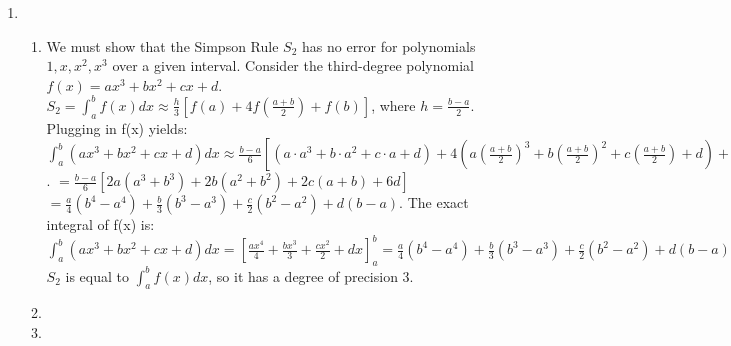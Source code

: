 \documentclass[12pt]{article}
\begin{document}
\begin{enumerate}[leftmargin=2em]
    \item 
    \begin{enumerate}[leftmargin=!]
        \item We must show that the Simpson Rule $S_2$ has no error for polynomials $1, x, x^{2}, x^{3}$ over a given interval. Consider the third-degree polynomial \( f(x) = ax^3 + bx^2 + cx + d \).
        \(S_2 = \int _{a}^{b}f(x)dx\approx \frac{h}{3}\left[f(a)+4f\left(\frac{a+b}{2}\right)+f(b)\right]\),
        where $h = \frac{b-a}{2}$.
        Plugging in f(x) yields:
        \(\int _{a}^{b}(ax^{3}+bx^{2}+cx+d)dx\approx \frac{b-a}{6}\left[(a\cdot a^{3}+b\cdot a^{2}+c\cdot a+d)+4\left(a\left(\frac{a+b}{2}\right)^{3}+b\left(\frac{a+b}{2}\right)^{2}+c\left(\frac{a+b}{2}\right)+d\right)+(a\cdot b^{3}+b\cdot b^{2}+c\cdot b+d)\right]\).
        \( = \frac{b-a}{6}\left[2a(a^{3}+b^{3})+2b(a^{2}+b^{2})+2c(a+b)+6d\right]\)
        \( = \frac{a}{4}(b^{4}-a^{4})+\frac{b}{3}(b^{3}-a^{3})+\frac{c}{2}(b^{2}-a^{2})+d(b-a)\).
        The exact integral of f(x) is:
        \(\int _{a}^{b}(ax^{3}+bx^{2}+cx+d)dx=\left[\frac{ax^{4}}{4}+\frac{bx^{3}}{3}+\frac{cx^{2}}{2}+dx\right]_{a}^{b}=\frac{a}{4}(b^{4}-a^{4})+\frac{b}{3}(b^{3}-a^{3})+\frac{c}{2}(b^{2}-a^{2})+d(b-a)\)
        $S_2$ is equal to \(\int _{a}^{b}f(x)dx\), so it has a degree of precision 3.
        \item

        \item
    \end{enumerate}
\end{enumerate}
\end{document}
